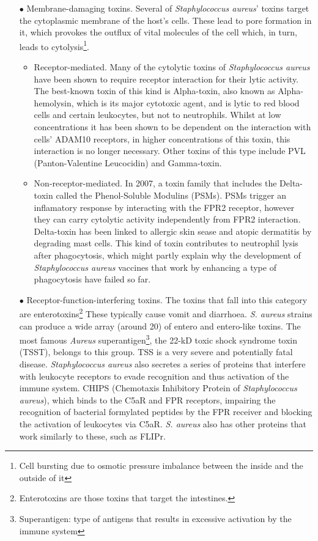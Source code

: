 \begin{itemize}
\item[$\bullet$] Membrane-damaging toxins. Several of \emph{Staphylococcus aureus}' toxins target the cytoplasmic membrane of the host's cells. These lead to pore formation in it, which provokes the outflux of vital molecules of the cell which, in turn, leads to cytolysis\footnote{Cell bursting due to osmotic pressure imbalance between the inside and the outside of it}.
   \begin{itemize}
        \item Receptor-mediated. Many of the cytolytic toxins of \emph{Staphylococcus aureus} have been shown to require receptor interaction for their lytic activity. The best-known toxin of this kind is Alpha-toxin, also known as Alpha-hemolysin, which is its major cytotoxic agent, and is lytic to red blood cells and certain leukocytes, but not to neutrophils. Whilst at low concentrations it has been shown to be dependent on the interaction with cells' ADAM10 receptors, in higher concentrations of this toxin, this interaction is no longer necessary. Other toxins of this type include  PVL (Panton-Valentine Leucocidin) and Gamma-toxin.
        \item Non-receptor-mediated. In 2007, a toxin family that includes the Delta-toxin called the Phenol-Soluble Modulins (PSMs). PSMs trigger an inflamatory response by interacting with the FPR2 receptor, however they can carry cytolytic activity independently from FPR2 interaction. Delta-toxin has been linked to allergic skin sease and atopic dermatitis by degrading mast cells. This kind of toxin contributes to neutrophil lysis after phagocytosis, which might partly explain why the development of \emph{Staphylococcus aureus} vaccines that work by enhancing a type of phagocytosis have failed so far. 
   \end{itemize}
\item[$\bullet$] Receptor-function-interfering toxins. The toxins that fall into this category are enterotoxins\footnote{Enterotoxins are those toxins that target the intestines.} These typically cause vomit and diarrhoea. \emph{S. aureus} strains can produce a wide array (around 20) of entero and entero-like toxins. The most famous \emph{Aureus} superantigen\footnote{Superantigen: type of antigens that results in excessive activation by the immune system}, the 22-kD toxic shock syndrome toxin (TSST), belongs to this group. TSS is a very severe and potentially fatal disease. \emph{Staphylococcus aureus} also secretes a series of proteins that interfere with leukocyte receptors to evade recognition and thus activation of the immune system. CHIPS (Chemotaxis Inhibitory Protein of \emph{Staphylococcus aureus}), which binds to the C5aR and FPR receptors, impairing the recognition of bacterial formylated peptides by the FPR receiver and blocking the activation of leukocytes via C5aR. \emph{S. aureus} also has other proteins that work similarly to these, such as FLIPr.

\end{itemize}
